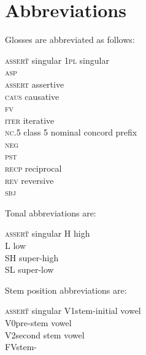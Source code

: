 \documentclass[output=paper
,newtxmath
,modfonts
,nonflat]{langsci/langscibook}
\begin{document}
\section*{Abbreviations}
 
Glosses are abbreviated as follows:
\begin{multicols}{2}
 \begin{tabbing}
  \textsc{assert}\hspace{1em}\= singular\kill
\textsc{1pl}   \>    singular\\
\textsc{asp}   \>   \\
\textsc{assert} \>   assertive\\
\textsc{caus} \>   causative\\
\textsc{fv}   \>   \\
\textsc{iter}   \> iterative\\
\textsc{nc}.5  \>  class 5 nominal concord prefix\\
\textsc{neg}   \>  \\
\textsc{pst}   \>  \\
\textsc{recp} \>  reciprocal\\
\textsc{rev} \>  reversive\\
\textsc{sbj} \>   
\end{tabbing}
\end{multicols}
 
\noindent Tonal abbreviations are:
\begin{multicols}{2}
 \begin{tabbing}
  \textsc{assert}\hspace{1em}\= singular\kill
 H    \> high\\
L    \> low\\
SH \> super-high\\
SL  \> super-low
\end{tabbing}
\end{multicols}

\noindent Stem position abbreviations are:
\begin{multicols}{2}
 \begin{tabbing}
  \textsc{assert}\hspace{1em}\= singular\kill
V1\>stem-initial vowel\\
V0\>pre-stem vowel\\
V2\>second stem vowel\\
FV\>stem-
\end{tabbing}
\end{multicols}

{\sloppy\printbibliography[heading=subbibliography,notkeyword=this]}
\end{document}
